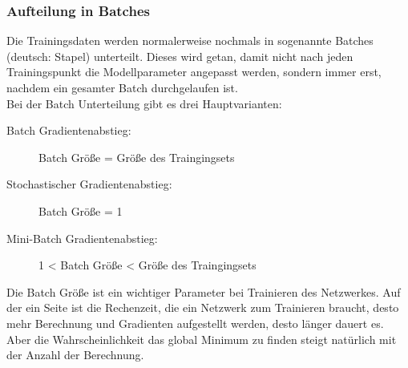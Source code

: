 \subsubsection{Aufteilung in Batches}
Die Trainingsdaten werden normalerweise nochmals in sogenannte Batches (deutsch: Stapel) unterteilt.  Dieses wird getan,  damit nicht nach jeden Trainingspunkt die Modellparameter angepasst werden,  sondern immer erst,  nachdem ein gesamter Batch durchgelaufen ist. \\
Bei der Batch Unterteilung gibt es drei Hauptvarianten:
\begin{description}
\item[Batch Gradientenabstieg: ]Batch Größe = Größe des Traingingsets
\item[Stochastischer Gradientenabstieg: ] Batch Größe = 1
\item[Mini-Batch Gradientenabstieg: ] 1 < Batch Größe < Größe des Traingingsets
\end{description}
Die Batch Größe ist ein wichtiger Parameter bei Trainieren des Netzwerkes.  Auf der ein Seite ist die Rechenzeit, die ein Netzwerk zum Trainieren braucht, desto mehr Berechnung und Gradienten aufgestellt werden, desto länger dauert es.  Aber die Wahrscheinlichkeit das global Minimum zu finden steigt natürlich mit der Anzahl der Berechnung. 


